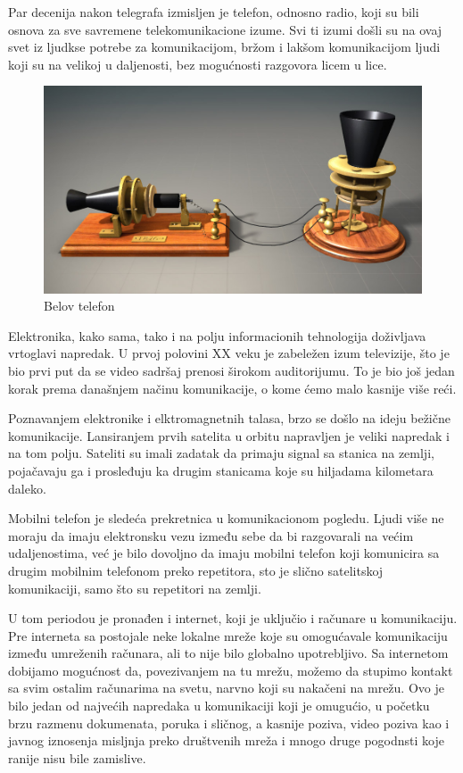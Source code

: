 \documentclass[12pt]{article}
\begin{document}
	Par decenija nakon telegrafa izmisljen je telefon, odnosno radio, koji  su bili osnova za sve savremene telekomunikacione izume. Svi ti izumi došli su na ovaj svet iz ljudkse potrebe za komunikacijom, bržom i lakšom komunikacijom ljudi koji su na velikoj u daljenosti, bez mogućnosti razgovora licem u lice. 

	
\begin{figure}
    \centering
    \includegraphics[scale=0.4]{telefon.jpg}
    \caption{Belov telefon}
\end{figure}

	Elektronika, kako sama, tako i na polju informacionih tehnologija doživljava vrtoglavi napredak. U prvoj polovini XX veku je zabeležen izum televizije, što je bio prvi put da se video sadršaj prenosi širokom auditorijumu. To je bio još jedan korak prema današnjem načinu komunikacije, o kome ćemo malo kasnije više reći.
	
	Poznavanjem elektronike i elktromagnetnih talasa, brzo se došlo na ideju bežične komunikacije. Lansiranjem prvih satelita u orbitu napravljen je veliki napredak i na tom polju. Sateliti su imali zadatak da primaju signal sa stanica na zemlji, pojačavaju ga i prosleđuju ka drugim stanicama koje su hiljadama kilometara daleko. 
	
	Mobilni telefon je sledeća prekretnica u komunikacionom pogledu. Ljudi više ne moraju da imaju elektronsku vezu između sebe da bi razgovarali na većim udaljenostima, već je bilo dovoljno da imaju mobilni telefon koji komunicira sa drugim mobilnim telefonom preko repetitora, sto je slično satelitskoj komunikaciji, samo što su repetitori na zemlji. 
	
	U tom periodou je pronađen i internet, koji je uključio i računare u komunikaciju. Pre interneta sa postojale neke lokalne mreže koje su omogućavale komunikaciju između umreženih računara, ali to nije bilo globalno upotrebljivo. Sa internetom dobijamo mogućnost da, povezivanjem na tu mrežu, možemo da stupimo kontakt sa svim ostalim računarima na svetu, narvno koji su nakačeni na mrežu. Ovo je bilo jedan od najvećih napredaka u komunikaciji koji je omugućio, u početku brzu razmenu dokumenata, poruka i sličnog, a kasnije poziva, video poziva kao i javnog iznosenja misljnja preko društvenih mreža i mnogo druge pogodnsti koje ranije nisu bile zamislive.
\end{document}

